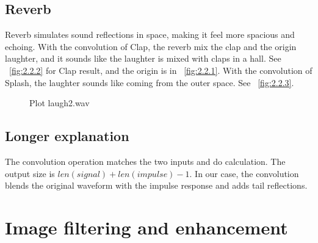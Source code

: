 \documentclass[12pt]{article}
\begin{document}
\subsection{Reverb}

Reverb simulates sound reflections in space, making it feel more spacious and echoing.
With the convolution of Clap, the reverb mix the clap and the origin laughter, and it sounds like the laughter is mixed with claps in a hall. See ~\ref{fig:2.2.2} for Clap result, and the origin is in ~\ref{fig:2.2.1}.
With the convolution of Splash, the laughter sounds like coming from the outer space.  See ~\ref{fig:2.2.3}.
\begin{figure}[ht]
\centering
{}
\caption[]{Plot laugh2.wav}
\label{fig:2.2}
\end{figure}


\subsection{Longer explanation}

The convolution operation matches the two inputs and do calculation. The output size is $len(signal)+len(impulse)-1$. In our case, the convolution blends the original waveform with the impulse response and adds tail reflections.

\section{Image filtering and enhancement}
\end{document}
